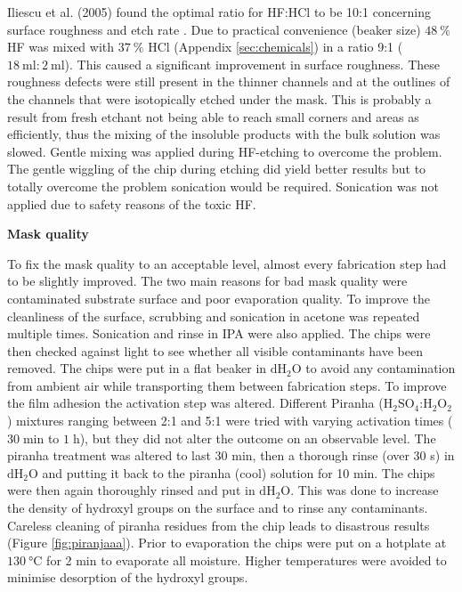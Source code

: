 \documentclass[final]{jyflluk}
\begin{document}
Iliescu et al. (2005) found the optimal ratio for HF:HCl to be 10:1 concerning surface roughness and etch rate \cite{iliescu2005characterization}. Due to practical convenience (beaker size) $\SI{48}{\percent}$ HF was mixed with $\SI{37}{\percent}$ HCl (Appendix \ref{sec:chemicals}) in a ratio 9:1 ($\SI{18}{\milli \litre}:\SI{2}{\milli \litre}$). This caused a significant improvement in surface roughness. These roughness defects were still present in the thinner channels and at the outlines of the channels that were isotopically etched under the mask. This is probably a result from fresh etchant not being able to reach small corners and areas as efficiently, thus the mixing of the insoluble products with the bulk solution was slowed. Gentle mixing was applied during HF-etching to overcome the problem. The gentle wiggling of the chip during etching did yield better results but to totally overcome the problem sonication would be required. Sonication was not applied due to safety reasons of the toxic HF.


\begin{flushleft}\textbf{Mask quality} \end{flushleft}
To fix the mask quality to an acceptable level, almost every fabrication step had to be slightly improved. The two main reasons for bad mask quality were contaminated substrate surface and poor evaporation quality. To improve the cleanliness of the surface, scrubbing and sonication in acetone was repeated multiple times. Sonication and rinse in IPA were also applied. The chips were then checked against light to see whether all visible contaminants have been removed. The chips were put in a flat beaker in $\mathrm{dH_2 O}$ to avoid any contamination from ambient air while transporting them between fabrication steps. 
To improve the film adhesion the activation step was altered. Different Piranha ($\mathrm{H_2 SO_4}$:$\mathrm{H_2 O_2}$) mixtures ranging between 2:1 and 5:1 were tried with varying activation times ($30 \;$min to $1\;$h), but they did not alter the outcome on an observable level. The piranha treatment was altered to last 30 min, then a thorough rinse (over 30 s) in $\mathrm{dH_2 O}$ and putting it back to the piranha (cool) solution for 10 min. The chips were then again thoroughly rinsed and put in $\mathrm{dH_2 O}$. This was done to increase the density of hydroxyl groups on the surface and to rinse any contaminants. Careless cleaning of piranha residues from the chip leads to disastrous results (Figure \ref{fig:piranjaaa}). Prior to evaporation the chips were put on a hotplate at $\SI{130}{\celsius}$ for 2 min to evaporate all moisture. Higher temperatures were avoided to minimise desorption of the hydroxyl groups.
\end{document}
